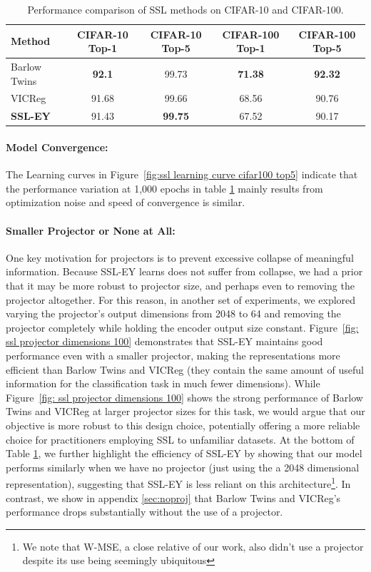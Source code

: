 \begin{table}
    \centering
    \begin{tabular}{lcccc}
        \hline
        Method          & CIFAR-10 Top-1 & CIFAR-10 Top-5 & CIFAR-100 Top-1 & CIFAR-100 Top-5 \\
        \hline
        Barlow Twins    & \textbf{92.1}  & 99.73          & \textbf{71.38}  & \textbf{92.32}  \\
        VICReg          & 91.68          & 99.66          & 68.56           & 90.76           \\
        \textbf{SSL-EY} & 91.43          & \textbf{99.75} & 67.52           & 90.17           \\
        \hline
    \end{tabular}
    \caption{Performance comparison of SSL methods on CIFAR-10 and CIFAR-100.}
    \label{tab:selfsup}
\end{table}

\paragraph{Model Convergence:} The Learning curves in Figure~\ref{fig:ssl learning curve cifar100 top5} indicate that the performance variation at 1,000 epochs in table \ref{tab:selfsup} mainly results from optimization noise and speed of convergence is similar.

\paragraph{Smaller Projector or None at All:}
One key motivation for projectors is to prevent excessive collapse of meaningful information. Because SSL-EY learns does not suffer from collapse, we had a prior that it may be more robust to projector size, and perhaps even to removing the projector altogether.
For this reason, in another set of experiments, we explored varying the projector's output dimensions from 2048 to 64 and removing the projector completely while holding the encoder output size constant. Figure~\ref{fig: ssl projector dimensions 100} demonstrates that SSL-EY maintains good performance even with a smaller projector, making the representations more efficient than Barlow Twins and VICReg (they contain the same amount of useful information for the classification task in much fewer dimensions). While Figure~\ref{fig: ssl projector dimensions 100} shows the strong performance of Barlow Twins and VICReg at larger projector sizes for this task, we would argue that our objective is more robust to this design choice, potentially offering a more reliable choice for practitioners employing SSL to unfamiliar datasets. At the bottom of Table \ref{tab:selfsup}, we further highlight the efficiency of SSL-EY by showing that our model performs similarly when we have no projector (just using the a 2048 dimensional representation), suggesting that SSL-EY is less reliant on this architecture\footnote{We note that W-MSE, a close relative of our work, also didn't use a projector despite its use being seemingly ubiquitous}. In contrast, we show in appendix \ref{sec:noproj} that Barlow Twins and VICReg's performance drops substantially without the use of a projector.

